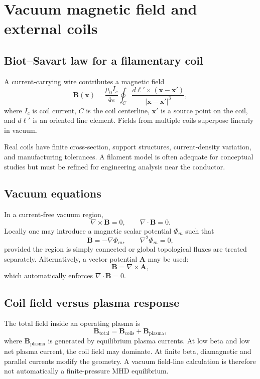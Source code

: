 \section{Vacuum magnetic field and external coils}
\label{sec:coils}

\subsection{Biot--Savart law for a filamentary coil}
A current-carrying wire contributes a magnetic field
\begin{equation}
\mathbf B(\mathbf x)
=\frac{\mu_0 I_c}{4\pi}
\oint_C
\frac{d\boldsymbol\ell'\times(\mathbf x-\mathbf x')}
{|\mathbf x-\mathbf x'|^3},
\label{eq:biot_savart}
\end{equation}
where $I_c$ is coil current, $C$ is the coil centerline, $\mathbf x'$ is a source point on the coil, and $d\boldsymbol\ell'$ is an oriented line element. Fields from multiple coils superpose linearly in vacuum.

Real coils have finite cross-section, support structures, current-density variation, and manufacturing tolerances. A filament model is often adequate for conceptual studies but must be refined for engineering analysis near the conductor.

\subsection{Vacuum equations}
In a current-free vacuum region,
\begin{equation}
\nabla\times\mathbf B=0,
\qquad
\nabla\cdot\mathbf B=0.
\end{equation}
Locally one may introduce a magnetic scalar potential $\Phi_m$ such that
\begin{equation}
\mathbf B=-\nabla\Phi_m,
\qquad
\nabla^2\Phi_m=0,
\end{equation}
provided the region is simply connected or global topological fluxes are treated separately. Alternatively, a vector potential $\mathbf A$ may be used:
\begin{equation}
\mathbf B=\nabla\times\mathbf A,
\end{equation}
which automatically enforces $\nabla\cdot\mathbf B=0$.

\subsection{Coil field versus plasma response}
The total field inside an operating plasma is
\begin{equation}
\mathbf B_{\mathrm{total}}
=\mathbf B_{\mathrm{coils}}+\mathbf B_{\mathrm{plasma}},
\label{eq:total_field}
\end{equation}
where $\mathbf B_{\mathrm{plasma}}$ is generated by equilibrium plasma currents. At low beta and low net plasma current, the coil field may dominate. At finite beta, diamagnetic and parallel currents modify the geometry. A vacuum field-line calculation is therefore not automatically a finite-pressure MHD equilibrium.

